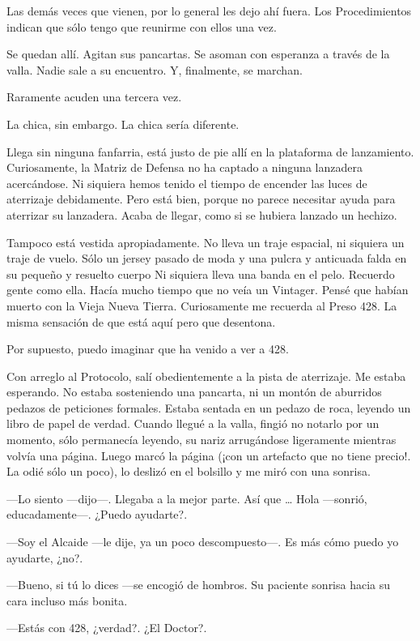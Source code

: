 Las demás veces que vienen, por lo general les dejo ahí fuera. Los
Procedimientos indican que sólo tengo que reunirme con ellos una vez.

Se quedan allí. Agitan sus pancartas. Se asoman con esperanza a través
de la valla. Nadie sale a su encuentro. Y, finalmente, se marchan.

Raramente acuden una tercera vez.

La chica, sin embargo. La chica sería diferente.

Llega sin ninguna fanfarria, está justo de pie allí en la plataforma de
lanzamiento. Curiosamente, la Matriz de Defensa no ha captado a ninguna
lanzadera acercándose. Ni siquiera hemos tenido el tiempo de encender
las luces de aterrizaje debidamente. Pero está bien, porque no parece
necesitar ayuda para aterrizar su lanzadera. Acaba de llegar, como si se
hubiera lanzado un hechizo.

Tampoco está vestida apropiadamente. No lleva un traje espacial, ni
siquiera un traje de vuelo. Sólo un jersey pasado de moda y una pulcra y
anticuada falda en su pequeño y resuelto cuerpo Ni siquiera lleva una
banda en el pelo. Recuerdo gente como ella. Hacía mucho tiempo que no
veía un Vintager. Pensé que habían muerto con la Vieja Nueva Tierra.
Curiosamente me recuerda al Preso 428. La misma sensación de que está
aquí pero que desentona.

Por supuesto, puedo imaginar que ha venido a ver a 428.

Con arreglo al Protocolo, salí obedientemente a la pista de aterrizaje.
Me estaba esperando. No estaba sosteniendo una pancarta, ni un montón de
aburridos pedazos de peticiones formales. Estaba sentada en un pedazo de
roca, leyendo un libro de papel de verdad. Cuando llegué a la valla,
fingió no notarlo por un momento, sólo permanecía leyendo, su nariz
arrugándose ligeramente mientras volvía una página. Luego marcó la
página (¡con un artefacto que no tiene precio!. La odié sólo un poco),
lo deslizó en el bolsillo y me miró con una sonrisa.

---Lo siento ---dijo---. Llegaba a la mejor parte. Así que \ldots{} Hola
---sonrió, educadamente---. ¿Puedo ayudarte?.

---Soy el Alcaide ---le dije, ya un poco descompuesto---. Es más cómo
puedo yo ayudarte, ¿no?.

---Bueno, si tú lo dices ---se encogió de hombros. Su paciente sonrisa
hacia su cara incluso más bonita.

---Estás con 428, ¿verdad?. ¿El Doctor?.

